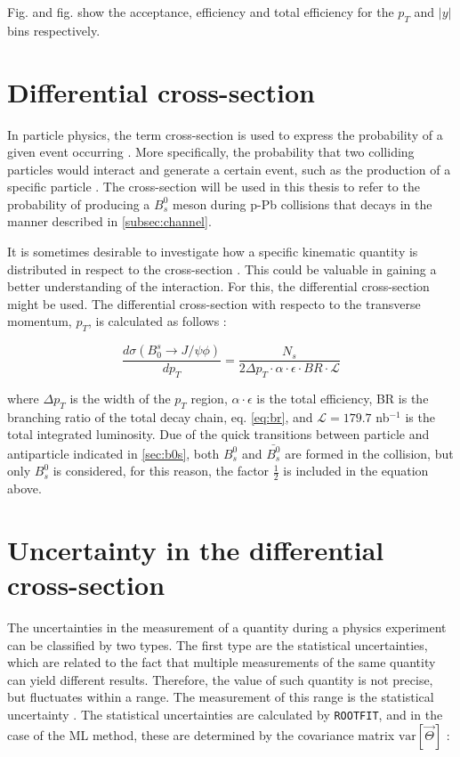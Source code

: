 Fig. and fig. show the acceptance, efficiency and total efficiency for the $p_T$ and $|y|$ bins respectively. 
\section{Differential cross-section}

In particle physics, the term cross-section is used to express the probability of a given event occurring \cite{thomson2013modern}. More specifically, the probability that two colliding particles would interact and generate a certain event, such as the production of a specific particle \cite{pivarski2013}. The cross-section will be used in this thesis to refer to the probability of producing a $B^0_s$ meson during p-Pb collisions that decays in the manner described in \ref{subsec:channel}.

It is sometimes desirable to investigate how a specific kinematic quantity is distributed in respect to the cross-section \cite{thomson2013modern}. This could be valuable in gaining a better understanding of the interaction. For this, the differential cross-section might be used. The differential cross-section with respecto to the transverse momentum, $p_T$, is calculated as follows \cite{abe1995measurement}: 

\begin{equation}
	\label{eq:cs}
\frac{d \sigma(B_0^s \to J/\psi\phi)}{dp_T} = \frac{N_s}{2 \Delta p_T \cdot \alpha \cdot \epsilon \cdot BR \cdot \mathcal{L}}
\end{equation}

where $\Delta p_T$ is the width of the $p_T$ region, $\alpha \cdot \epsilon$ is the total efficiency, BR is the branching ratio of the total decay chain, eq. \ref{eq:br}, and $\mathcal{L} = 179.7$ nb$^{-1}$  is the total integrated luminosity. Due of the quick transitions between particle and antiparticle indicated in \ref{sec:b0s}, both $B^0_s$ and $\bar{B^0_s}$ are formed in the collision, but only $B^0_s$ is considered, for this reason, the factor $\frac{1}{2}$ is included in the equation above.

\section{Uncertainty in the differential cross-section}
The uncertainties in the measurement of a quantity during a physics experiment can be classified by two types. The first type are the statistical uncertainties, which are related to the fact that multiple measurements of the same quantity can yield different results. Therefore, the value of such quantity is not precise, but fluctuates within a range. The measurement of this range is the statistical uncertainty \cite{sinervo2003definition}. The statistical uncertainties are calculated by \verb|ROOTFIT|, and in the case of the ML method, these are determined by the covariance matrix $\mathrm{var}[\vec{\Theta}]$ \cite{vsirca2016probability}:


